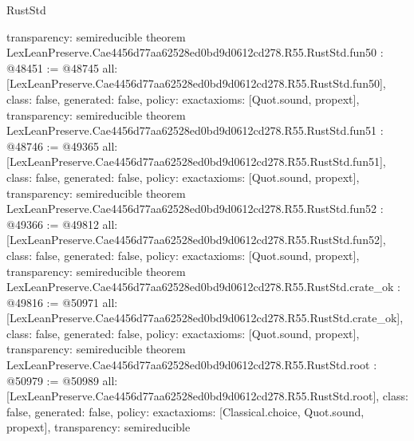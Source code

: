 \begin{lexlean}{RustStd}
\begin{coremodule}
{  transparency: semireducible
}
theorem LexLeanPreserve.Cae4456d77aa62528ed0bd9d0612cd278.R55.RustStd.fun50 : @48451 := @48745 {
  all: [LexLeanPreserve.Cae4456d77aa62528ed0bd9d0612cd278.R55.RustStd.fun50],
  class: false,
  generated: false,
  policy: exact{axioms: [Quot.sound, propext]},
  transparency: semireducible
}
theorem LexLeanPreserve.Cae4456d77aa62528ed0bd9d0612cd278.R55.RustStd.fun51 : @48746 := @49365 {
  all: [LexLeanPreserve.Cae4456d77aa62528ed0bd9d0612cd278.R55.RustStd.fun51],
  class: false,
  generated: false,
  policy: exact{axioms: [Quot.sound, propext]},
  transparency: semireducible
}
theorem LexLeanPreserve.Cae4456d77aa62528ed0bd9d0612cd278.R55.RustStd.fun52 : @49366 := @49812 {
  all: [LexLeanPreserve.Cae4456d77aa62528ed0bd9d0612cd278.R55.RustStd.fun52],
  class: false,
  generated: false,
  policy: exact{axioms: [Quot.sound, propext]},
  transparency: semireducible
}
theorem LexLeanPreserve.Cae4456d77aa62528ed0bd9d0612cd278.R55.RustStd.crate_ok : @49816 := @50971 {
  all: [LexLeanPreserve.Cae4456d77aa62528ed0bd9d0612cd278.R55.RustStd.crate_ok],
  class: false,
  generated: false,
  policy: exact{axioms: [Quot.sound, propext]},
  transparency: semireducible
}
theorem LexLeanPreserve.Cae4456d77aa62528ed0bd9d0612cd278.R55.RustStd.root : @50979 := @50989 {
  all: [LexLeanPreserve.Cae4456d77aa62528ed0bd9d0612cd278.R55.RustStd.root],
  class: false,
  generated: false,
  policy: exact{axioms: [Classical.choice, Quot.sound, propext]},
  transparency: semireducible
}


\end{coremodule}
\end{lexlean}
